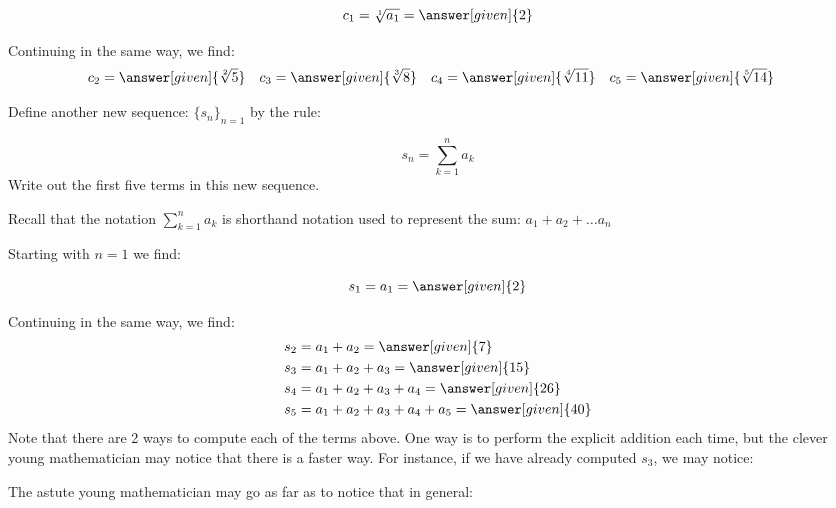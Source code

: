 \documentclass{ximera}
\begin{document}
\begin{example}
\begin{example}
\begin{explanation}
\[      c_1 = \sqrt[1]{a_1} = \answer[given]{2}       \]
      
Continuing in the same way, we find:     
     \begin{align*}
      	c_2 &=  \answer[given]{\sqrt[2]{5}}  & 
	c_3 &= \answer[given]{\sqrt[3]{8}}   & 
	c_4 &= \answer[given]{\sqrt[4]{11}}   & 
	c_5 &=  \answer[given]{\sqrt[5]{14}}   & 
    \end{align*}
    
\end{explanation}
\end{example}

\begin{example}
Define another new sequence: $\{s_n\}_{n=1}$ by the rule:

\[
s_n = \sum_{k=1}^n a_k 
\]
Write out the first five terms in this new sequence.

Recall that the notation $\sum_{k=1}^n a_k$ is shorthand notation used to represent the sum: $a_1+a_2+\ldots a_n$



\begin{explanation}
Starting with $n=1$ we find:

\[      s_1 = a_1 = \answer[given]{2}       \]
      
Continuing in the same way, we find:     
     \begin{align*}
      	s_2 &=  a_1 +a_2 = \answer[given]{7}  \\ 
	s_3 &=  a_1 +a_2 + a_3 = \answer[given]{15}   \\ 
	s_4 &=  a_1 +a_2 +a_3 +a_4= \answer[given]{26}  \\ 
	s_5 &=  a_1 +a_2 +a_3+a_4+a_5= \answer[given]{40}    
    \end{align*}
Note that there are 2 ways to compute each of the terms above.  One way is to perform the explicit addition each time, but the clever young mathematician may notice that there is a faster way.  For instance, if we have already computed $s_3$, we may notice:

\begin{image}
  \end{image}

The astute young mathematician may go as far as to notice that in general:


\end{explanation}
\end{example}
\end{example}
\end{document}
